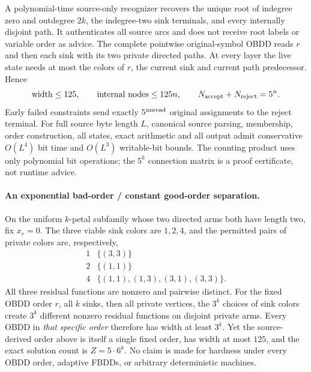 \documentclass[11pt]{article}
\begin{document}
A polynomial-time source-only recognizer recovers the unique root
of indegree zero and outdegree $2k$, the indegree-two sink terminals,
and every internally disjoint path. It authenticates all source arcs
and does not receive root labels or variable order as advice.
The complete pointwise original-symbol OBDD reads $r$ and then
each sink with its two private directed paths. At every layer
the live state needs at most the colors of $r$, the current sink
and current path predecessor. Hence
\[
\operatorname{width}\le125,\qquad
\operatorname{internal\ nodes}\le125n,
\qquad N_{\rm accept}+N_{\rm reject}=5^n.
\]
Early failed constraints send exactly $5^{\rm unread}$ original
assignments to the reject terminal. For full source byte length
$L$, canonical source parsing, membership, order construction,
all states, exact arithmetic and all output admit conservative
$O(L^4)$ bit time and $O(L^3)$ writable-bit bounds.
The counting product uses only polynomial bit operations;
the $5^k$ connection matrix is a proof certificate,
not runtime advice.

\paragraph{An exponential bad-order / constant good-order separation.}
On the uniform $k$-petal subfamily whose two directed arms both
have length two, fix $x_r=0$. The three viable sink colors are
$1,2,4$, and the permitted pairs of private colors are, respectively,
\[
\begin{array}{c|l}
1&\{(3,3)\}\\
2&\{(1,1)\}\\
4&\{(1,1),(1,3),(3,1),(3,3)\}.
\end{array}
\]
All three residual functions are nonzero and pairwise distinct.
For the fixed OBDD order $r$, all $k$ sinks, then all private
vertices, the $3^k$ choices of sink colors create $3^k$
different nonzero residual functions on disjoint private arms.
Every OBDD in \emph{that specific order} therefore has
width at least $3^k$. Yet the source-derived order above is
itself a single fixed order, has width at most $125$, and the
exact solution count is $Z=5\cdot6^k$.
No claim is made for hardness under every OBDD order,
adaptive FBDDs, or arbitrary deterministic machines.
\end{document}
